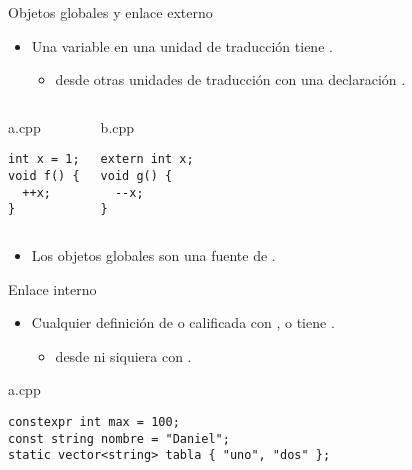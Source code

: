 \begin{frame}[t,fragile]{Objetos globales y enlace externo}
\begin{itemize}
  \item Una variable  en una unidad de traducción 
        tiene .
    \begin{itemize}
      \item {} desde otras unidades de traducción 
            con una declaración .
    \end{itemize}
\end{itemize}

\begin{columns}[T]

\begin{block}{a.cpp}
\begin{lstlisting}
int x = 1;
void f() {
  ++x;
}
\end{lstlisting}
\end{block}

\begin{block}{b.cpp}
\begin{lstlisting}
extern int x;
void g() {
  --x;
}
\end{lstlisting}
\end{block}


\end{columns}

\begin{itemize}
  \item Los objetos globales son una fuente de .
\end{itemize}
\end{frame}

\begin{frame}[t,fragile]{Enlace interno}
\begin{itemize}
  \item Cualquier definición de 
         o 
        calificada con 
        ,  o 
        tiene .
    \begin{itemize}
      \item {} desde  
            ni siquiera con .
    \end{itemize}
\end{itemize}
\begin{block}{a.cpp}
\begin{lstlisting}
constexpr int max = 100;
const string nombre = "Daniel";
static vector<string> tabla { "uno", "dos" };
\end{lstlisting}
\end{block}
\end{frame}

